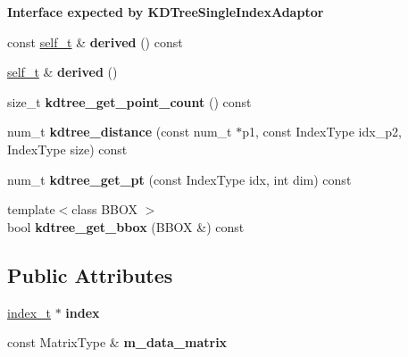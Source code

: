\begin{Indent}{\bf Interface expected by K\+D\+Tree\+Single\+Index\+Adaptor}\par
\begin{DoxyCompactItemize}
\item 
\hypertarget{structSph_1_1KDTreeEigenMatrixAdaptor_a29415a29d18e35f85a547607af77ff36}{}\label{structSph_1_1KDTreeEigenMatrixAdaptor_a29415a29d18e35f85a547607af77ff36} 
const \hyperlink{structSph_1_1KDTreeEigenMatrixAdaptor}{self\+\_\+t} \& {\bfseries derived} () const
\item 
\hypertarget{structSph_1_1KDTreeEigenMatrixAdaptor_a08ff232f37f98831214840241ce533b0}{}\label{structSph_1_1KDTreeEigenMatrixAdaptor_a08ff232f37f98831214840241ce533b0} 
\hyperlink{structSph_1_1KDTreeEigenMatrixAdaptor}{self\+\_\+t} \& {\bfseries derived} ()
\item 
\hypertarget{structSph_1_1KDTreeEigenMatrixAdaptor_a997746aa0357843f8f408f0606a14abe}{}\label{structSph_1_1KDTreeEigenMatrixAdaptor_a997746aa0357843f8f408f0606a14abe} 
size\+\_\+t {\bfseries kdtree\+\_\+get\+\_\+point\+\_\+count} () const
\item 
\hypertarget{structSph_1_1KDTreeEigenMatrixAdaptor_ad021e6fc3289c680fc0c6b0997903edd}{}\label{structSph_1_1KDTreeEigenMatrixAdaptor_ad021e6fc3289c680fc0c6b0997903edd} 
num\+\_\+t {\bfseries kdtree\+\_\+distance} (const num\+\_\+t $\ast$p1, const Index\+Type idx\+\_\+p2, Index\+Type size) const
\item 
\hypertarget{structSph_1_1KDTreeEigenMatrixAdaptor_aba83e56df76a23345da096f19d99dbd3}{}\label{structSph_1_1KDTreeEigenMatrixAdaptor_aba83e56df76a23345da096f19d99dbd3} 
num\+\_\+t {\bfseries kdtree\+\_\+get\+\_\+pt} (const Index\+Type idx, int dim) const
\item 
\hypertarget{structSph_1_1KDTreeEigenMatrixAdaptor_ae4c86f274b110668c318198af3d96897}{}\label{structSph_1_1KDTreeEigenMatrixAdaptor_ae4c86f274b110668c318198af3d96897} 
{\footnotesize template$<$class B\+B\+OX $>$ }\\bool {\bfseries kdtree\+\_\+get\+\_\+bbox} (B\+B\+OX \&) const
\end{DoxyCompactItemize}
\end{Indent}
\subsection*{Public Attributes}
\begin{DoxyCompactItemize}
\item 
\hypertarget{structSph_1_1KDTreeEigenMatrixAdaptor_a84e218145bfbdbb4b5eec2e4fd5c78f1}{}\label{structSph_1_1KDTreeEigenMatrixAdaptor_a84e218145bfbdbb4b5eec2e4fd5c78f1} 
\hyperlink{classSph_1_1KDTreeSingleIndexAdaptor}{index\+\_\+t} $\ast$ {\bfseries index}
\item 
\hypertarget{structSph_1_1KDTreeEigenMatrixAdaptor_ac56802ad9745e240e0885a6a3af6e597}{}\label{structSph_1_1KDTreeEigenMatrixAdaptor_ac56802ad9745e240e0885a6a3af6e597} 
const Matrix\+Type \& {\bfseries m\+\_\+data\+\_\+matrix}
\end{DoxyCompactItemize}


